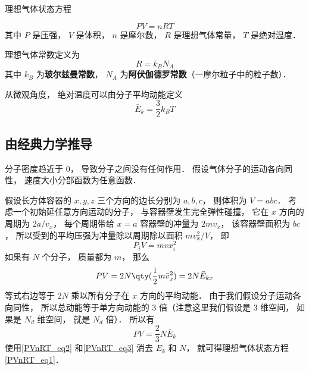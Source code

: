 
理想气体状态方程

\begin{equation}\label{PVnRT_eq1}
PV = nRT
\end{equation}
其中 $P$ 是压强， $V$ 是体积， $n$ 是摩尔数， $R$ 是理想气体常量， $T$ 是绝对温度．

理想气体常数定义为
\begin{equation}\label{PVnRT_eq2}
R = k_B N_A
\end{equation}
其中 $k_B$ 为\textbf{玻尔兹曼常数}， $N_A$ 为\textbf{阿伏伽德罗常数}（一摩尔粒子中的粒子数）．

从微观角度， 绝对温度可以由分子平均动能定义
\begin{equation}\label{PVnRT_eq3}
\bar E_k = \frac32 k_B T
\end{equation}

\subsection{由经典力学推导}
分子密度趋近于 0， 导致分子之间没有任何作用． 假设气体分子的运动各向同性， 速度大小分部函数为任意函数．

假设长方体容器的 $x, y, z$ 三个方向的边长分别为 $a, b, c$， 则体积为  $V = abc$． 考虑一个初始延任意方向运动的分子， 与容器壁发生完全弹性碰撞， 它在 $x$ 方向的周期为 $2a/v_x$， 每个周期带给 $x = a$ 容器壁的冲量为 $2m v_x$， 该容器壁面积为 $bc$， 所以受到的平均压强为冲量除以周期除以面积 $mv_x^2/V$， 即
\begin{equation}
P_i V = mv x_i^2
\end{equation}
如果有 $N$ 个分子， 质量都为 $m$， 那么
\begin{equation}
P V = 2 N \qty(\frac12 m \bar v_x^2) = 2 N \bar E_{kx}
\end{equation}
等式右边等于 $2N$ 乘以所有分子在 $x$ 方向的平均动能． 由于我们假设分子运动各向同性， 所以总动能等于单方向动能的 3 倍（注意这里我们假设是 3 维空间， 如果是 $N_d$ 维空间， 就是 $N_d$ 倍）． 所以有
\begin{equation}
P V = \frac23 N \bar E_k
\end{equation}
使用\autoref{PVnRT_eq2} 和\autoref{PVnRT_eq3} 消去 $E_k$ 和 $N$， 就可得理想气体状态方程\autoref{PVnRT_eq1}．
